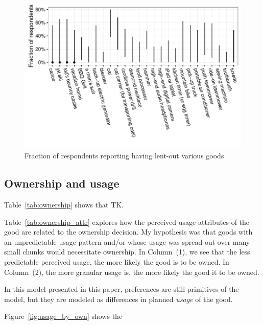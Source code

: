 \documentclass[11pt]{article}
\begin{document}
\begin{figure}
\centering 
\label{fig:lending} 
\caption{Fraction of respondents reporting having lent-out various goods}
\begin{minipage}{0.90 \linewidth}
\includegraphics[width = \linewidth]{./plots/lent_fractions.pdf} 
\end{minipage} 
\end{figure} 

\subsection{Ownership and usage} 

Table~\ref{tab:ownership} shows that TK. 



Table~\ref{tab:ownership_attr} explores how the perceived usage attributes of the good are related to the ownership decision.
My hypothesis was that goods with an unpredictable usage pattern and/or whose usage was spread out over many small chunks would necessitate ownership. 
In Column~(1), we see that the less predictable perceived usage, the more likely the good is to be owned. 
In Column~(2), the more granular usage is, the more likely the good it to be owned. 

 

In this model presented in this paper, preferences are still primitives of the model, but they are modeled as differences in planned \emph{usage} of the good.  

Figure~\ref{fig:usage_by_own} shows the 
\end{document}
